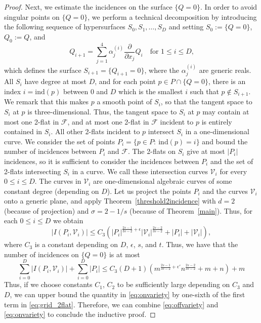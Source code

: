\documentclass[11pt]{article}
\theoremstyle{definition}
\begin{document}
\begin{proof}
Next, we estimate the incidences on the surface $\{ Q=0 \}$. In order to avoid singular points on $\{ Q=0 \}$, we perform a technical decomposition by introducing the following sequence of hypersurfaces $S_0, S_1, \dots, S_D$ and setting $S_0 := \{ Q=0 \}$, $Q_0 := Q$, and
\begin{equation*}
    Q_{i+1} = \sum_{j=1}^{4} \alpha_j^{(i)} \frac{\partial}{\partial x_j}Q_i \quad \text{for $1 \leq i \leq D$,}
\end{equation*} which defines the surface $S_{i+1} = \{ Q_{i+1} = 0 \}$, where the $\alpha_j^{(i)}$ are generic reals. All $S_i$ have degree at most $D$, and for each point $p \in P \cap \{ Q=0 \}$, there is an index $i = \text{ind}(p)$ between $0$ and $D$ which is the smallest $i$ such that $p \notin S_{i+1}$. We remark that this makes $p$ a smooth point of $S_i$, so that the tangent space to $S_i$ at $p$ is three-dimensional. Thus, the tangent space to $S_i$ at $p$ may contain at most one 2-flat in $\mathcal{F}$, and at most one 2-flat in $\mathcal{F}$ incident to $p$ is entirely contained in $S_i$. All other 2-flats incident to $p$ intersect $S_i$ in a one-dimensional curve. We consider the set of points $P_i = \{ p \in P:\ \text{ind}(p) = i \}$ and bound the number of incidences between $P_i$ and $\mathcal{F}$. The 2-flats on $S_i$ give at most $|P_i|$ incidences, so it is sufficient to consider the incidences between $P_i$ and the set of 2-flats intersecting $S_i$ in a curve. We call these intersection curves $\mathcal{V}_i$ for every $0 \leq i \leq D$. The curves in $\mathcal{V}_i$ are one-dimensional algebraic curves of some constant degree (depending on $D$). Let us project the points $P_i$ and the curves $\mathcal{V}_i$ onto a generic plane, and apply Theorem~\ref{threshold2incidence} with $d=2$ (because of projection) and $\sigma = 2- 1/s$ (because of Theorem~\ref{main}). Thus, for each $0 \leq i \leq D$ we obtain
\begin{equation*}
    |I(P_i, \mathcal{V}_i)|\leq C_3\left( |P_i|^{\frac{2s-1}{3s-2}+\epsilon}|\mathcal{V}_i|^{\frac{2s-2}{3s-2}} + |P_i| + |\mathcal{V}_i| \right),
\end{equation*} where $C_3$ is a constant depending on $D$, $\epsilon$, $s$, and $t$. Thus, we have that the number of incidences on $\{ Q = 0 \}$ is at most
\begin{equation}\label{eq:onvariety}
    \sum_{i=0}^{D} |I(P_i, \mathcal{V}_i)| + \sum_{i=0}^{D} |P_i| \leq C_3(D+1)\left(m^{\frac{2s-1}{3s-2}+\epsilon'} n^\frac{2s-2}{3s-2} + m + n\right) + m
\end{equation}
Thus, if we choose constants $C_1$, $C_2$ to be sufficiently large depending on $C_3$ and $D$, we can upper bound the quantity in \eqref{eq:onvariety} by one-sixth of the first term in \eqref{eq:grid_2flat}. Therefore, we can combine \eqref{eq:offvariety} and \eqref{eq:onvariety} to conclude the inductive proof.
\end{proof}
\end{document}
